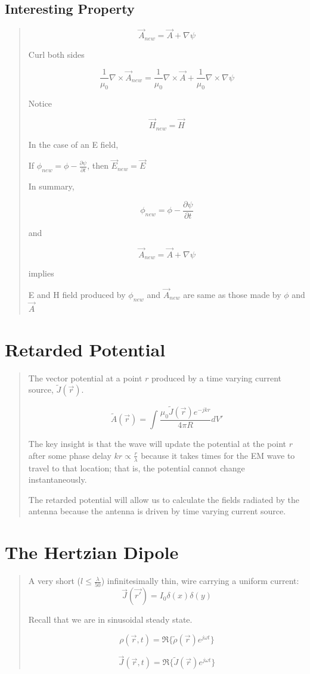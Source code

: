 \documentclass{article} %
\begin{document}
\subsection{Interesting Property}
\begin{quote}
    \[\vec{A}_{new} = \vec{A} + \nabla\psi\]

    Curl both sides

    \[\frac{1}{\mu_0}\nabla \times \vec{A}_{new} = \frac{1}{\mu_0}\nabla \times \vec{A} + \frac{1}{\mu_0}\nabla \times \nabla\psi\]

    Notice

    \[\vec{H}_{new} = \vec{H}\]

    In the case of an E field,

    If $\phi_{new} = \phi - \frac{\partial \psi}{\partial t}$, then $\vec{E}_{new} = \vec{E}$

    \bigskip
    In summary,

    \[\phi_{new} = \phi - \frac{\partial \psi}{\partial t}\]

    and

    \[\vec{A}_{new} = \vec{A} + \nabla\psi\]

    implies

    \bigskip
    E and H field produced by $\phi_{new}$ and $\vec{A}_{new}$ are same as those made by $\phi$ and $\vec{A}$
\end{quote}

\section{Retarded Potential}
\begin{quote}
    The vector potential at a point $r$ produced by a time varying current source, $\widetilde{J}(\vec{r})$.

    \[\widetilde{A}(\vec{r}) = \int \frac{\mu_0 \widetilde{J}(\vec{r})e^{-jkr}}{4\pi R} dV'\]

    The key insight is that the wave will update the potential at the point $r$ after some phase delay $kr \propto \frac{r}{\lambda}$ because it takes times for the EM wave to travel to that location; that is, the potential cannot change instantaneously.

    The retarded potential will allow us to calculate the fields radiated by the antenna because the antenna is driven by time varying current source.
\end{quote}

\section{The Hertzian Dipole}
\begin{quote}
    A very short ($l \leq \frac{\lambda}{50}$) infinitesimally thin, wire carrying a uniform current:
    \[\vec{J}(\vec{r'}) = I_0 \delta(x)\delta(y)\]

    Recall that we are in sinusoidal steady state.

    \[\rho(\vec{r}, t) = \Re \{\tilde{\rho}(\vec{r})e^{j \omega t}\}\]

    \[\vec{J}(\vec{r}, t) = \Re \{\tilde{J}(\vec{r})e^{j \omega t}\}\]
\end{quote}
\end{document}
